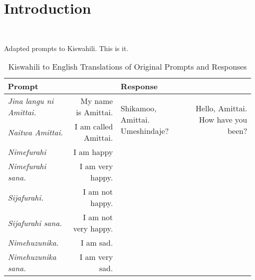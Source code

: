\section{Introduction}~\label{sec:introduction}

Adapted prompts to Kiswahili. This is it.

\begin{table}[H]
  \centering
  \small
  \begin{tabular}{l  r | l r}
    \toprule
    \textbf{Prompt} & &  \textbf{Response} \\
    \midrule
    \emph{Jina langu ni Amittai.} & My name is Amittai. & \multirow{2}{*}{Shikamoo, Amittai. Umeshindaje?} & \multirow{2}{*}{Hello, Amittai. How have you been?} \\
    \emph{Naitwa Amittai.} & I am called Amittai. & &  \\
    \midrule
    \emph{Nimefurahi} & I am happy & & \\
    \emph{Nimefurahi sana.} & I am very happy. & & \\
    \midrule
    \emph{Sijafurahi.} & I am not happy. & & \\
    \emph{Sijafurahi sana.} & I am not very happy. & & \\
    \midrule
    \emph{Nimehuzunika.} & I am sad. & & \\
    \emph{Nimehuzunika sana.} & I am very sad. & & \\
    \midrule
    



    \toprule  
  \end{tabular}
  
  \caption{Kiswahili to English Translations of Original Prompts and Responses}
\end{table}
